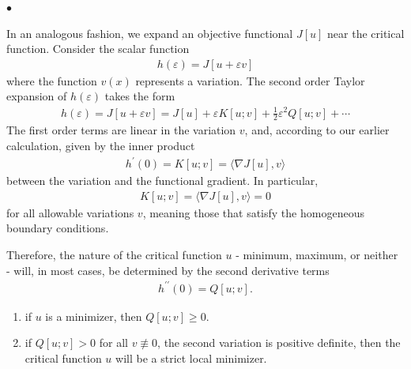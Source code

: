 \documentclass{article}
\begin{document}
$\bullet$ 

In an analogous fashion, we expand an objective functional $J[u]$ near the critical function. Consider the scalar function
\begin{align*}
h(\varepsilon)=J[u+\varepsilon v]
\end{align*}
where the function $v(x)$ represents a variation. The second order Taylor expansion of $h(\varepsilon)$ takes the form
\begin{align*}
h(\varepsilon)=J[u+\varepsilon v]=J[u]+\varepsilon K[u ; v]+\frac{1}{2} \varepsilon^{2} Q[u ; v]+\cdots
\end{align*}
The first order terms are linear in the variation $v$, and, according to our earlier calculation, given by the inner product
\begin{align*}
h^{\prime}(0)=K[u ; v]=\langle\nabla J[u], v\rangle
\end{align*}
between the variation and the functional gradient. In particular, 
\begin{align*}
K[u ; v]=\langle\nabla J[u], v\rangle=0
\end{align*}
for all allowable variations $v$, meaning those that satisfy the homogeneous boundary conditions. 

Therefore, the nature of the critical function $u$ - minimum, maximum, or neither - will, in most cases, be determined by the second derivative terms
\begin{align*}
h^{\prime \prime}(0)=Q[u ; v] .
\end{align*}
\begin{enumerate}
    \item if $u$ is a minimizer, then $Q[u ; v] \geq 0$. 
    \item if $Q[u ; v]>0$ for all $v \not \equiv 0$, the second variation is positive definite, then the critical function $u$ will be a strict local minimizer. 
\end{enumerate}
\end{document}
